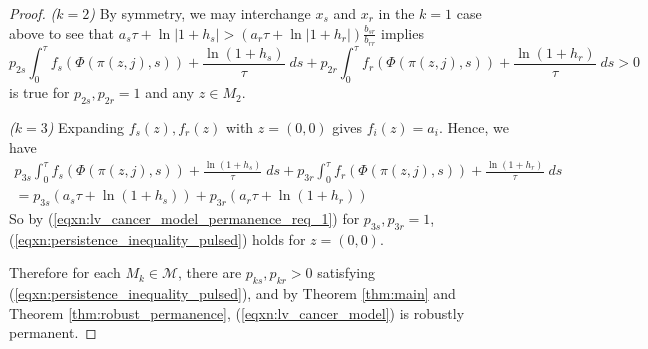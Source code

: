\documentclass[10pt,a4paper]{amsart}
\begin{document}
\begin{proof}
    \textit{($k = 2$)}  
    By symmetry, we may interchange $x_s$ and $x_r$ in the $k = 1$ case above to see that $a_s\tau + \ln{|1+h_s|} > \left(a_r\tau + \ln{|1 + h_r|}\right)\frac{b_{sr}}{b_{rr}}$ implies
    \begin{equation*}
        p_{2s}\int_0^{\tau} f_s(\Phi(\pi(z,j),s)) + \frac{\ln{(1+h_s)}}{\tau}\; ds +  p_{2r} \int_0^{\tau} f_r(\Phi(\pi(z,j),s)) + \frac{\ln{(1+h_r)}}{\tau}\; ds > 0
    \end{equation*}
    is true for $p_{2s}, p_{2r} = 1$ and any $z \in M_2$.

    \textit{($k = 3$)}
    Expanding $f_s(z), f_r(z)$ with $z = (0,0)$ gives $f_i(z) = a_i$. Hence, we have
    \begin{equation*}
    \begin{split}
        p_{3s} \int_0^{\tau} f_s(\Phi(\pi(z,j), s)) + \frac{\ln{(1+h_s)}}{\tau}\; ds +  p_{3r} \int_0^{\tau} f_r(\Phi(\pi(z,j), s)) + \frac{\ln{(1+h_r)}}{\tau}\; ds \\
        =
        p_{3s} (a_s \tau + \ln{(1+h_s)}) + p_{3r}( a_r \tau + \ln{(1+h_r)})
    \end{split}
    \end{equation*}
    So by (\ref{eqxn:lv_cancer_model_permanence_req_1}) for $p_{3s}, p_{3r} = 1$, (\ref{eqxn:persistence_inequality_pulsed}) holds for $z = (0,0)$. 
    
    Therefore for each $M_k \in \mathcal{M}$, there are $p_{ks}, p_{kr} > 0$ satisfying (\ref{eqxn:persistence_inequality_pulsed}), and by Theorem \ref{thm:main} and Theorem \ref{thm:robust_permanence}, (\ref{eqxn:lv_cancer_model}) is robustly permanent.
\end{proof}
\end{document}
